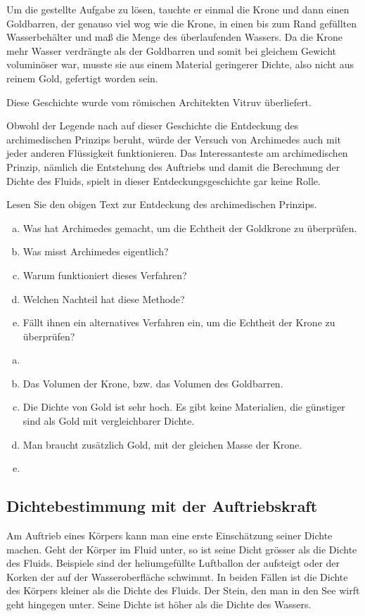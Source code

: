 Um die gestellte Aufgabe zu lösen, tauchte er einmal die Krone und dann einen Goldbarren, 
der genauso viel wog wie die Krone, in einen bis zum Rand gefüllten Wasserbehälter und maß die Menge des überlaufenden Wassers. 
Da die Krone mehr Wasser verdrängte als der Goldbarren und somit bei gleichem Gewicht voluminöser war,
musste sie aus einem Material geringerer Dichte, also nicht aus reinem Gold, gefertigt worden sein.

Diese Geschichte wurde vom römischen Architekten Vitruv überliefert.

Obwohl der Legende nach auf dieser Geschichte die Entdeckung des archimedischen Prinzips beruht, 
würde der Versuch von Archimedes auch mit jeder anderen Flüssigkeit funktionieren. 
Das Interessanteste am archimedischen Prinzip, nämlich die Entstehung des Auftriebs und damit die Berechnung der Dichte des Fluids, 
spielt in dieser Entdeckungsgeschichte gar keine Rolle.

\begin{aufgabe}
	Lesen Sie den obigen Text zur Entdeckung des archimedischen Prinzips.
	\begin{enumerate} [a)]
		\item Was hat Archimedes gemacht, um die Echtheit der Goldkrone zu überprüfen.
        \item Was misst Archimedes eigentlich?
		\item Warum funktioniert dieses Verfahren?
		\item Welchen Nachteil hat diese Methode?
		\item Fällt ihnen ein alternatives Verfahren ein, um die Echtheit der Krone zu überprüfen?
	\end{enumerate}
	\begin{loesung}
		\begin{enumerate} [a)]
			\item
            \item Das Volumen der Krone, bzw. das Volumen des Goldbarren. 
			\item Die Dichte von Gold ist sehr hoch. Es gibt keine Materialien, die günstiger sind als Gold mit vergleichbarer Dichte.
			\item Man braucht zusätzlich Gold, mit der gleichen Masse der Krone.
			\item
		\end{enumerate}
	\end{loesung}
\end{aufgabe}

\subsection*{Dichtebestimmung mit der Auftriebskraft}
Am Auftrieb eines Körpers kann man eine erste Einschätzung seiner Dichte machen.
Geht der Körper im Fluid unter, so ist seine Dicht grösser als die Dichte des Fluids.
Beispiele sind der heliumgefüllte Luftballon der aufsteigt oder der Korken der auf der 
Wasseroberfläche schwimmt. In beiden Fällen ist die Dichte des Körpers kleiner als die
Dichte des Fluids. Der Stein, den man in den See wirft geht hingegen unter. Seine Dichte ist
höher als die Dichte des Wassers.


